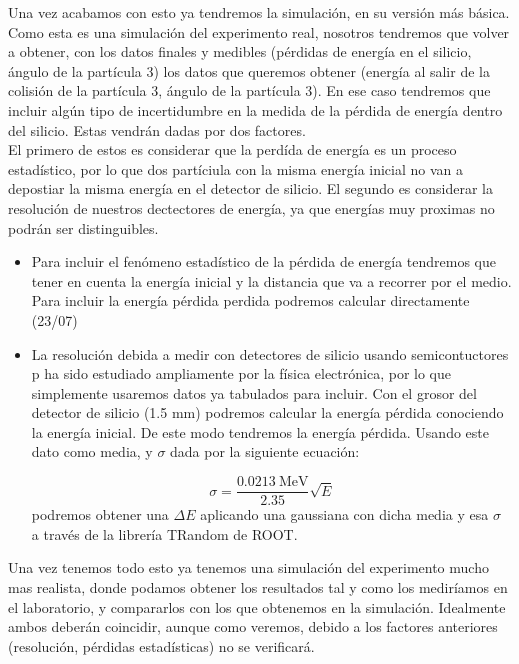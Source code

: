 \documentclass[12pt,a4paper]{article}
\numberwithin{equation}{section}
\numberwithin{figure}{section}
\begin{document}
Una vez acabamos con esto ya tendremos la simulación, en su versión más básica. Como esta es una simulación del experimento real, nosotros tendremos que volver a obtener, con los datos finales y medibles (pérdidas de energía en el silicio, ángulo de la partícula 3) los datos que queremos obtener (energía al salir de la colisión de la partícula 3, ángulo de la partícula 3). En ese caso tendremos que incluir algún tipo de incertidumbre en la medida de la pérdida de energía dentro del silicio. Estas vendrán dadas por dos factores. \\

El primero de estos es considerar que la perdída de energía es un proceso estadístico, por lo que dos partíciula con la misma energía inicial no van a depostiar la misma energía en el detector de silicio. El segundo es considerar la resolución de nuestros dectectores de energía, ya que energías muy proximas no podrán ser distinguibles. 

\begin{itemize}
    \item Para incluir el fenómeno estadístico de la pérdida de energía tendremos que tener en cuenta la energía inicial y la distancia que va a recorrer por el medio. Para incluir la energía pérdida perdida podremos calcular directamente (23/07)
    
    \item La resolución debida a medir con detectores de silicio usando semicontuctores p ha sido estudiado ampliamente por la física electrónica, por lo que simplemente usaremos datos ya tabulados para incluir. Con el grosor del detector de silicio (1.5 mm) podremos calcular la energía pérdida conociendo la energía inicial. De este modo tendremos la energía pérdida. Usando este dato como media, y $\sigma$ dada por la siguiente ecuación: 
    
    \begin{equation}
        \sigma = \frac{0.0213 \  \text{MeV}}{2.35} \sqrt{E}
    \end{equation}
    podremos obtener una $\Delta E$ aplicando una gaussiana con dicha media y esa $\sigma$ a través de la librería TRandom de ROOT. 

\end{itemize}

Una vez tenemos todo esto ya tenemos una simulación del experimento mucho mas realista, donde podamos obtener los resultados tal y como los mediríamos en el laboratorio, y compararlos con los que obtenemos en la simulación. Idealmente ambos deberán coincidir, aunque como veremos, debido a los factores anteriores (resolución, pérdidas estadísticas) no se verificará. 
\end{document}
